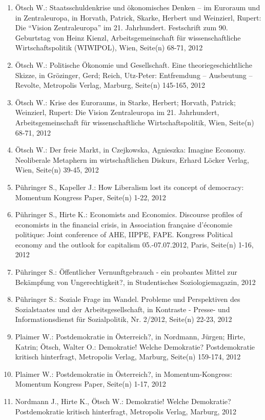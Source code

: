 \begin{enumerate}
    	 \item Ötsch W.: Staatsschuldenkrise und ökonomisches Denken – im Euroraum und in Zentraleuropa, in Horvath, Patrick, Skarke, Herbert  und Weinzierl, Rupert: Die “Vision Zentraleuropa” im 21. Jahrhundert. Festschrift zum 90. Geburtstag von Heinz Kienzl, Arbeitsgemeinschaft für wissenschaftliche Wirtschaftspolitik (WIWIPOL), Wien, Seite(n) 68-71, 2012
	 \item Ötsch W.: Politische Ökonomie und Gesellschaft. Eine theoriegeschichtliche Skizze, in Grözinger, Gerd; Reich, Utz-Peter: Entfremdung – Ausbeutung – Revolte, Metropolis Verlag, Marburg, Seite(n) 145-165, 2012
	 \item Ötsch W.: Krise des Euroraums, in Starke, Herbert; Horvath, Patrick; Weinzierl, Rupert: Die Vision Zentraleuropa im 21. Jahrhundert, Arbeitsgemeinschaft für wissenschaftliche Wirtschaftspolitik, Wien, Seite(n) 68-71, 2012
	 \item Ötsch W.: Der freie Markt, in Czejkowska, Agnieszka: Imagine Economy. Neoliberale Metaphern im wirtschaftlichen Diskurs, Erhard Löcker Verlag, Wien, Seite(n) 39-45, 2012
	 \item Pühringer S., Kapeller J.: How Liberalism lost its concept of democracy: Momentum Kongress Paper, Seite(n) 1-22, 2012
	 \item Pühringer S., Hirte K.: Economists and Economics. Discourse profiles of economists in the financial crisis, in Association française d'économie politique: Joint conference of AHE, IIPPE, FAPE. Kongress Political economy and the outlook for capitalism 05.-07.07.2012, Paris, Seite(n) 1-16, 2012
	 \item Pühringer S.: Öffentlicher Vernunftgebrauch - ein probantes Mittel zur Bekämpfung von Ungerechtigkeit?, in Studentisches Soziologiemagazin, 2012
	 \item Pühringer S.: Soziale Frage im Wandel. Probleme und Perspektiven des Sozialstaates und der Arbeitsgesellschaft, in Kontraste - Presse- und Informationsdienst für Sozialpolitik, Nr. 2/2012, Seite(n) 22-23, 2012
	 \item Plaimer W.: Postdemokratie in Österreich?, in Nordmann, Jürgen; Hirte, Katrin; Ötsch, Walter O.: Demokratie! Welche Demokratie? Postdemokratie kritisch hinterfragt, Metropolis Verlag, Marburg, Seite(n) 159-174, 2012
	 \item Plaimer W.: Postdemokratie in Österreich?, in Momentum-Kongress: Momentum Kongress Paper, Seite(n) 1-17, 2012
	 \item Nordmann J., Hirte K., Ötsch W.: Demokratie! Welche Demokratie? Postdemokratie kritisch hinterfragt, Metropolis Verlag, Marburg, 2012

\end{enumerate}
